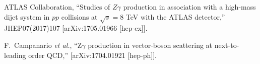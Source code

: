\documentclass[10pt]{article}
\begin{document}
\begin{thebibliography}{99}


  ATLAS Collaboration,
  ``Studies of $Z\gamma$ production in association with a high-mass dijet system in $pp$ collisions at $\sqrt{s}=8$ TeV with the ATLAS detector,''
  JHEP07(2017)107
  [arXiv:1705.01966 [hep-ex]].
  
  
  F.~Campanario {\it et al.},
  ``Z$\gamma$ production in vector-boson scattering at next-to-leading order QCD,''
  [arXiv:1704.01921 [hep-ph]].



\end{thebibliography}

 
\end{document}
